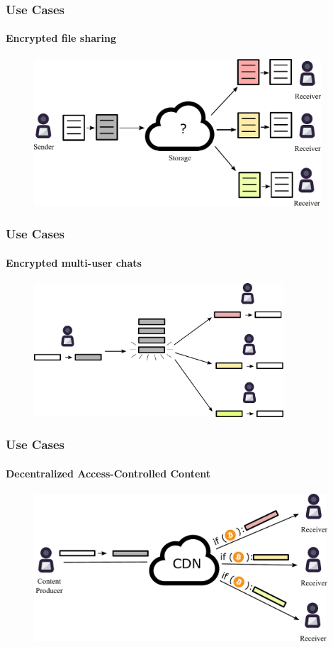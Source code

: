 \documentclass[xetex,mathsans,sans]{beamer}
\begin{document}
    \begin{frame}
        \frametitle{Use Cases}
        \framesubtitle{Encrypted file sharing}
        \begin{figure}
            \centering
            \includegraphics[height=5.5cm]{pdf/file-sharing.pdf}
        \end{figure}
    \end{frame}

    \begin{frame}
        \frametitle{Use Cases}
        \framesubtitle{Encrypted multi-user chats}
        \begin{figure}
            \centering
            \includegraphics[height=5cm]{pdf/chats.pdf}
        \end{figure}
    \end{frame}

    \begin{frame}
        \frametitle{Use Cases}
        \framesubtitle{Decentralized Access-Controlled Content}
        \begin{figure}
            \centering
            \includegraphics[height=5.5cm]{pdf/content.pdf}
        \end{figure}
    \end{frame}
\end{document}
